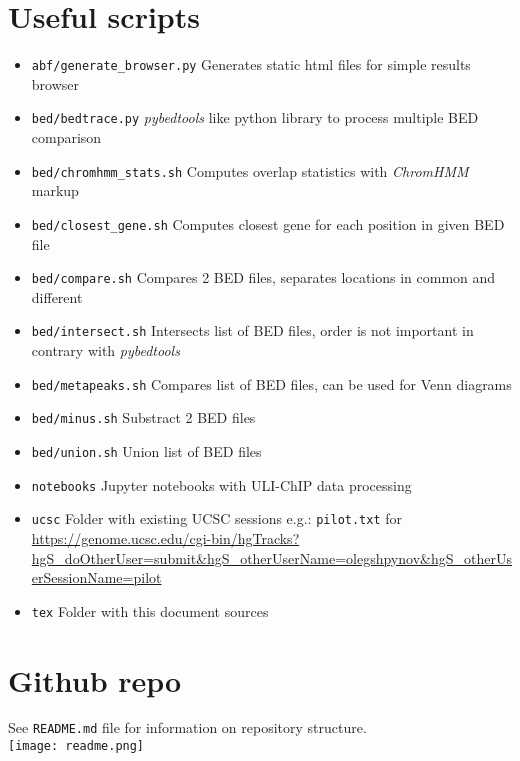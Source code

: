 \documentclass{article}
\begin{document}
\section{Useful scripts}
\begin{itemize}
\item \texttt{abf/generate\_browser.py} Generates static html files for simple results browser
\item \texttt{bed/bedtrace.py} \textit{pybedtools} like python library to process multiple BED comparison
\item \texttt{bed/chromhmm\_stats.sh} Computes overlap statistics with \textit{ChromHMM} markup
\item \texttt{bed/closest\_gene.sh} Computes closest gene for each position in given BED file
\item \texttt{bed/compare.sh} Compares 2 BED files, separates locations in common and different
\item \texttt{bed/intersect.sh} Intersects list of BED files, order is not important in contrary with \textit{pybedtools}
\item \texttt{bed/metapeaks.sh} Compares list of BED files, can be used for Venn diagrams
\item \texttt{bed/minus.sh} Substract 2 BED files
\item \texttt{bed/union.sh} Union list of BED files
\item \texttt{notebooks} Jupyter notebooks with ULI-ChIP data processing
\item \texttt{ucsc} Folder with existing UCSC sessions e.g.: \texttt{pilot.txt} for \url{https://genome.ucsc.edu/cgi-bin/hgTracks?hgS_doOtherUser=submit&hgS_otherUserName=olegshpynov&hgS_otherUserSessionName=pilot}
\item \texttt{tex} Folder with this document sources 
\end{itemize}

\section{Github repo}
See \texttt{README.md} file for information on repository structure.\\
\texttt{[image: readme.png]}
\end{document}
